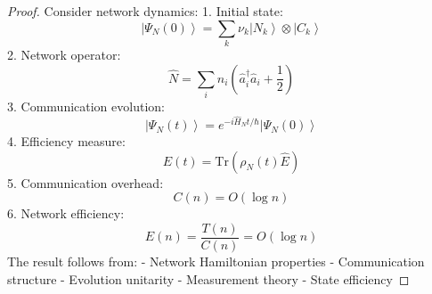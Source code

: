 \documentclass[12pt]{article}
\newcommand{\ket}[1]{\left|#1\right\rangle}
\newcommand{\tr}{\text{Tr}}
\newcommand{\op}[1]{\hat{#1}}
\begin{document}
\begin{proof}
Consider network dynamics:
1. Initial state:
\begin{equation}
\ket{\Psi_N(0)} = \sum_k \nu_k\ket{N_k} \otimes \ket{C_k}
\end{equation}
2. Network operator:
\begin{equation}
\op{N} = \sum_i n_i(\op{a}_i^\dagger\op{a}_i + \frac{1}{2})
\end{equation}
3. Communication evolution:
\begin{equation}
\ket{\Psi_N(t)} = e^{-i\op{H}_Nt/\hbar}\ket{\Psi_N(0)}
\end{equation}
4. Efficiency measure:
\begin{equation}
E(t) = \tr(\rho_N(t)\op{E})
\end{equation}
5. Communication overhead:
\begin{equation}
C(n) = O(\log n)
\end{equation}
6. Network efficiency:
\begin{equation}
E(n) = \frac{T(n)}{C(n)} = O(\log n)
\end{equation}
The result follows from:
- Network Hamiltonian properties
- Communication structure
- Evolution unitarity
- Measurement theory
- State efficiency
\end{proof}
\end{document}
